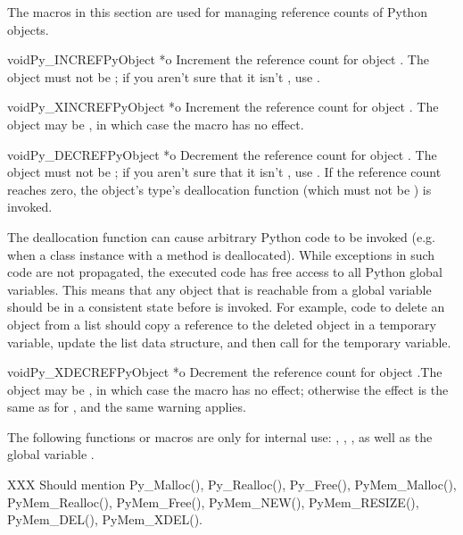 \documentclass[twoside,openright]{report}
\begin{document}
The macros in this section are used for managing reference counts
of Python objects.

\begin{cfuncdesc}{void}{Py_INCREF}{PyObject *o}
Increment the reference count for object .  The object must
not be \NULL{}; if you aren't sure that it isn't \NULL{}, use
.
\end{cfuncdesc}

\begin{cfuncdesc}{void}{Py_XINCREF}{PyObject *o}
Increment the reference count for object .  The object may be
\NULL{}, in which case the macro has no effect.
\end{cfuncdesc}

\begin{cfuncdesc}{void}{Py_DECREF}{PyObject *o}
Decrement the reference count for object .  The object must
not be \NULL{}; if you aren't sure that it isn't \NULL{}, use
.  If the reference count reaches zero, the object's
type's deallocation function (which must not be \NULL{}) is invoked.

 The deallocation function can cause arbitrary Python
code to be invoked (e.g. when a class instance with a 
method is deallocated).  While exceptions in such code are not
propagated, the executed code has free access to all Python global
variables.  This means that any object that is reachable from a global
variable should be in a consistent state before  is
invoked.  For example, code to delete an object from a list should
copy a reference to the deleted object in a temporary variable, update
the list data structure, and then call  for the
temporary variable.
\end{cfuncdesc}

\begin{cfuncdesc}{void}{Py_XDECREF}{PyObject *o}
Decrement the reference count for object .The object may be
\NULL{}, in which case the macro has no effect; otherwise the
effect is the same as for , and the same warning
applies.
\end{cfuncdesc}

The following functions or macros are only for internal use:
, , ,
as well as the global variable .

XXX Should mention Py_Malloc(), Py_Realloc(), Py_Free(),
PyMem_Malloc(), PyMem_Realloc(), PyMem_Free(), PyMem_NEW(),
PyMem_RESIZE(), PyMem_DEL(), PyMem_XDEL().
\end{document}
